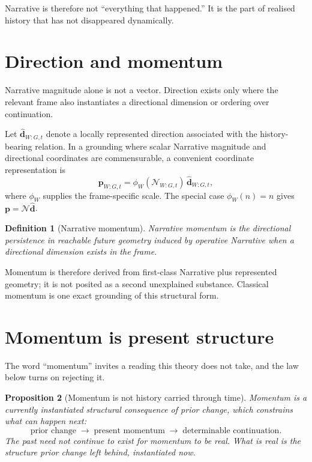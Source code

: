 \documentclass[11pt,a4paper]{article}
\newtheorem{definition}{Definition}[section]
\newtheorem{proposition}[definition]{Proposition}
\theoremstyle{remark}
\newcommand{\Narr}{\mathcal N}
\begin{document}
Narrative is therefore not ``everything that happened.'' It is the part of realised history that has not disappeared dynamically.

\section{Direction and momentum}\label{sec:momentum}
Narrative magnitude alone is not a vector. Direction exists only where the relevant frame also instantiates a directional dimension or ordering over continuation.

Let $\hat{\mathbf d}_{W:G,t}$ denote a locally represented direction associated with the history-bearing relation. In a grounding where scalar Narrative magnitude and directional coordinates are commensurable, a convenient coordinate representation is
\[
\boxed{\mathbf p_{W:G,t}=\phi_W(\Narr_{W:G,t})\,\hat{\mathbf d}_{W:G,t},}
\]
where $\phi_W$ supplies the frame-specific scale. The special case $\phi_W(n)=n$ gives $\mathbf p=\Narr\hat{\mathbf d}$.

\begin{definition}[Narrative momentum]\label{def:narrative-momentum}
Narrative momentum is the directional persistence in reachable future geometry induced by operative Narrative when a directional dimension exists in the frame.
\end{definition}

Momentum is therefore derived from first-class Narrative plus represented geometry; it is not posited as a second unexplained substance. Classical momentum is one exact grounding of this structural form.

\section{Momentum is present structure}\label{sec:momentum-present}

The word ``momentum'' invites a reading this theory does not take, and the law below turns on rejecting it.

\begin{proposition}[Momentum is not history carried through time]\label{prop:momentum-present}
Momentum is a \emph{currently instantiated structural consequence} of prior change, which constrains what can happen next:
\[
\boxed{\text{prior change}\;\rightarrow\;\text{present momentum}\;\rightarrow\;\text{determinable continuation}.}
\]
The past need not continue to exist for momentum to be real. What is real is the structure prior change left behind, instantiated now.
\end{proposition}
\end{document}
